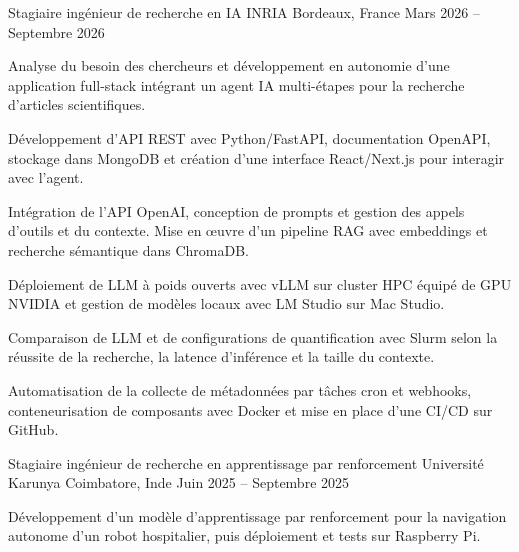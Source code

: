 
\begin{cventries}
  \cventry
    {Stagiaire ingénieur de recherche en IA}
    {INRIA}
    {Bordeaux, France}
    {Mars 2026 -- Septembre 2026}
    {
      \begin{cvitems}
        \item {Analyse du besoin des chercheurs et développement en autonomie d’une application full-stack intégrant un agent IA multi-étapes pour la recherche d’articles scientifiques.}
        \item {Développement d’API REST avec Python/FastAPI, documentation OpenAPI, stockage dans MongoDB et création d’une interface React/Next.js pour interagir avec l’agent.}
        \item {Intégration de l’API OpenAI, conception de prompts et gestion des appels d’outils et du contexte. Mise en œuvre d’un pipeline RAG avec embeddings et recherche sémantique dans ChromaDB.}
        \item {Déploiement de LLM à poids ouverts avec vLLM sur cluster HPC équipé de GPU NVIDIA et gestion de modèles locaux avec LM Studio sur Mac Studio.}
        \item {Comparaison de LLM et de configurations de quantification avec Slurm selon la réussite de la recherche, la latence d’inférence et la taille du contexte.}
        \item {Automatisation de la collecte de métadonnées par tâches cron et webhooks, conteneurisation de composants avec Docker et mise en place d’une CI/CD sur GitHub.}
      \end{cvitems}
    }

  \cventry
    {Stagiaire ingénieur de recherche en apprentissage par renforcement}
    {Université Karunya}
    {Coimbatore, Inde}
    {Juin 2025 -- Septembre 2025}
    {
      \begin{cvitems}
        \item {Développement d’un modèle d’apprentissage par renforcement pour la navigation autonome d’un robot hospitalier, puis déploiement et tests sur Raspberry Pi.}
      \end{cvitems}
    }
\end{cventries}
